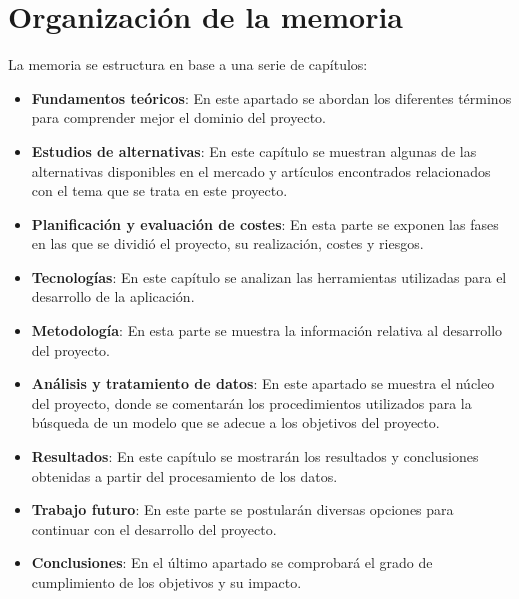 
 
\section{Organización de la memoria}

 
La memoria se estructura en base a una serie de capítulos:
\begin{itemize}
    \item \textbf{Fundamentos teóricos}: En este apartado se abordan los diferentes términos para comprender mejor el dominio del proyecto.
    
    \item \textbf{Estudios de alternativas}: En este capítulo se muestran algunas de las alternativas disponibles en el mercado y artículos encontrados relacionados con el tema que se trata en este proyecto.
    
    \item \textbf{Planificación y evaluación de costes}: En esta parte se exponen las fases en las que se dividió el proyecto, su realización, costes y riesgos.
    
    \item \textbf{Tecnologías}: En este capítulo se analizan las herramientas utilizadas para el desarrollo de la aplicación.
    
    \item \textbf{Metodología}: En esta parte se muestra la información relativa al desarrollo del proyecto.
    
    
    \item \textbf{Análisis y tratamiento de datos}: En este apartado se muestra el núcleo del proyecto, donde se comentarán los procedimientos utilizados para la búsqueda de un modelo que se adecue a los objetivos del proyecto.
    
    \item \textbf{Resultados}: En este capítulo se mostrarán los resultados y conclusiones obtenidas a partir del procesamiento de los datos.
    
    \item \textbf{Trabajo futuro}: En este parte se postularán diversas opciones para continuar con el desarrollo del proyecto.
    
    \item \textbf{Conclusiones}: En el último apartado se comprobará el grado de cumplimiento de los objetivos y su impacto.
    
\end{itemize}